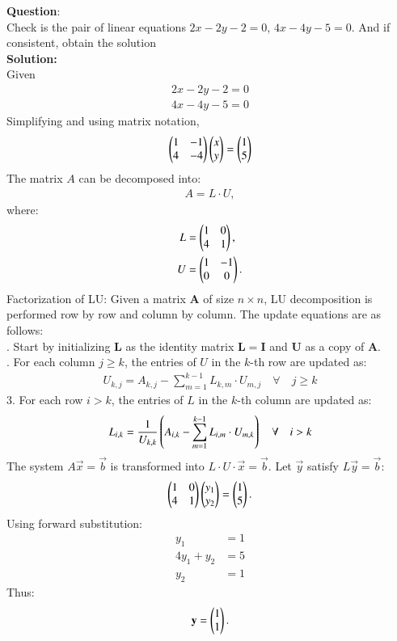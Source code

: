 \documentclass[journal]{IEEEtran}
\begin{document}
\textbf{Question}:\\
Check is the pair of linear equations $2x-2y-2=0$, $4x-4y-5=0$. And if consistent, obtain the solution
\\
\textbf{Solution: }\\
Given
\begin{align}
    2x-2y-2=0\\
    4x-4y-5 = 0
\end{align}
Simplifying and using matrix notation,
\begin{align}
    \begin{pmatrix}
        1 & -1\\
        4 & -4
    \end{pmatrix} \begin{pmatrix}x \\ y\end{pmatrix}= \begin{pmatrix} 1 \\ 5\end{pmatrix}
\end{align}
The matrix $A$ can be decomposed into:
\begin{align}
    A = L \cdot U,
\end{align}
where:
\begin{align}
    L &= \begin{pmatrix}1 & 0 \\ 4 & 1\end{pmatrix}, \\
    U &= \begin{pmatrix}1 & -1 \\ 0 & 0\end{pmatrix}.
\end{align}
\newline
Factorization of LU:\newline
Given a matrix $ \mathbf{A} $ of size $ n \times n $, LU decomposition is performed row by row and column by column. The update equations are as follows: \\ 
. Start by initializing $ \mathbf{L} $ as the identity matrix $ \mathbf{L} = \mathbf{I} $ and $ \mathbf{U} $ as a copy of $ \mathbf{A} $.\\
. For each column $ j \geq k $, the entries of $ U $ in the $ k $-th row are updated as:
\begin{align}
U_{k,j} = A_{k,j} - \sum_{m=1}^{k-1} L_{k,m} \cdot U_{m,j}\quad \forall \quad j \geq k
\end{align}
3. For each row $ i > k $, the entries of $ L $ in the $ k $-th column are updated as:
\begin{align}
L_{i,k} = \frac{1}{U_{k,k}} \left( A_{i,k} - \sum_{m=1}^{k-1} L_{i,m} \cdot U_{m,k}\right) \quad \forall \quad i > k
\end{align}
The system $A\vec{x} = \vec{b}$ is transformed into $L \cdot U \cdot \vec{x} = \vec{b}$. Let $\vec{y}$ satisfy $L\vec{y} = \vec{b}$:
\begin{align}
    \begin{pmatrix}1 & 0 \\ 4 & 1\end{pmatrix} \begin{pmatrix}y_1 \\ y_2\end{pmatrix} = \begin{pmatrix}1 \\ 5\end{pmatrix}.
\end{align}
Using forward substitution:
\begin{align}
    y_1 &= 1 \\
    4y_1 + y_2 &= 5\\
    y_2 &= 1
\end{align}
Thus:
\begin{align}
    \mathbf{y} = \begin{pmatrix}1 \\ 1\end{pmatrix}.
\end{align}
\end{document}
